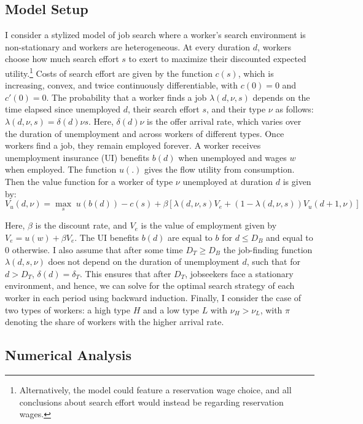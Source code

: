 \documentclass{div}
\begin{document}
\subsection{Model Setup}
I consider a stylized model of job search where a worker's search environment is non-stationary \citep{Mortensen1986, VanDenBerg1990} and workers are heterogeneous. At every duration $d$, workers choose how much search effort $s$ to exert to maximize their discounted expected utility.\footnote{Alternatively, the model could feature a reservation wage choice, and all conclusions about search effort would instead be regarding reservation wages.} Costs of search effort are given by the function $c(s)$, which is increasing, convex, and twice continuously differentiable, with $c(0)=0$ and $c'(0)=0$. The probability that a worker finds a job $\lambda(d,\nu,s)$ depends on the time elapsed since unemployed $d$, their search effort $s$, and their type $\nu$ as follows: $\lambda(d,\nu,s) = \delta(d)\nu s $. Here, $\delta(d) \nu$ is the offer arrival rate, which varies over the duration of unemployment and across workers of different types. Once workers find a job, they remain employed forever. A worker receives unemployment insurance (UI) benefits $b(d)$ when unemployed and wages $w$ when employed. The function $u(.)$ gives the flow utility from consumption. Then the value function for a worker of type $\nu$ unemployed at duration $d$ is given by:
$$ V_u(d,\nu) = \max_{s} \; u(b(d)) -c(s)+ \beta \left[\lambda(d,\nu, s) V_e+ \left(1-\lambda(d,\nu, s) \right) V_u(d+1,\nu)  \right] $$

Here, $\beta$ is the discount rate, and $V_e$ is the value of employment given by $ V_e = u(w) + \beta V_e $. The UI benefits $b(d)$ are equal to $b$ for $d \leq D_B$ and equal to 0 otherwise. I also assume that after some time $D_T \geq D_B $ the job-finding function $\lambda(d,s,\nu)$ does not depend on the duration of unemployment $d$, such that for $d>D_T$, $\delta(d)=\delta_T$. This ensures that after $D_T$, jobseekers face a stationary environment, and hence, we can solve for the optimal search strategy of each worker in each period using backward induction. Finally, I consider the case of two types of workers: a high type $H$ and a low type $L$ with $\nu_H>\nu_L$, with $\pi$ denoting the share of workers with the higher arrival rate. 


\subsection{Numerical Analysis}
\end{document}
